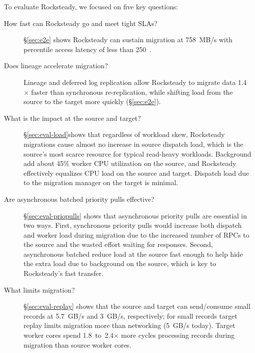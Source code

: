 To evaluate Rocksteady, we focused on five key questions:
\begin{description}
\item[How fast can Rocksteady go and meet tight SLAs?]
  \S\ref{sec:e2e} shows Rocksteady can sustain migration at
    758~MB/s with \nnnth percentile access latency of less than 250~\us.
\item[Does lineage accelerate migration?]
  Lineage and deferred log replication allow Rocksteady to migrate data
    1.4$\times$ faster than synchronous re-replication, while shifting
    load from the source to the target more quickly (\S\ref{sec:e2e}).
\item[What is the impact at the source and target?]
  \S\ref{sec:eval-load}\linebreak{}shows that regardless of workload skew, Rocksteady
    migrations cause almost no increase in source dispatch load, which is the source's
    most scarce resource for typical read-heavy workloads. Background \pulls
    add about 45\% worker CPU utilization on the source, and Rocksteady
    effectively equalizes CPU load on the source and target.
    Dispatch load due to the migration manager on the target is minimal.
\item[Are asynchronous batched priority pulls effective?]
  \S\ref{sec:eval-priopulls} shows that asynchronous priority pulls are
    essential in two ways. First, synchronous priority pulls would increase both
    dispatch and worker load during migration due to the increased number of
    RPCs to the source and the wasted effort waiting for \priopull responses. Second,
    asynchronous batched \priopulls reduce load at the source fast enough to help
    hide the extra load due to background \pulls on the source, which is key to
    Rocksteady's fast transfer.
\item[What limits migration?]
  \S\ref{sec:eval-replay} shows that the source and target can send/consume
    small records at 5.7~GB/s and 3~GB/s, respectively; for small records
    target replay limits migration more than 
    networking (5~GB/s today).
    Target worker cores spend 1.8~to~2.4$\times$ more cycles
    processing records during migration than source worker cores.

\end{description}

